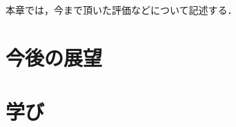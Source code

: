 \documentclass[../report]{subfiles}
\begin{document}
本章では，今まで頂いた評価などについて記述する．


\section{今後の展望}

\section{学び}
\end{document}
